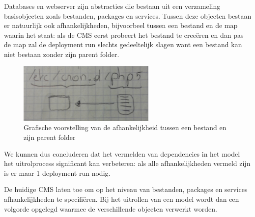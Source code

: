 Databases en webserver zijn abstracties die bestaan uit een verzameling basisobjecten zoals bestanden, packages en services.
Tussen deze objecten bestaan er natuurlijk ook afhankelijkheden, bijvoorbeel tussen een bestand en de map waarin het staat:
als de CMS eerst probeert het bestand te cree\"eren en dan pas de map zal de deployment run slechts gedeeltelijk slagen want een bestand kan niet bestaan zonder zijn parent folder.
\begin{figure}
    \label{fig:file_dir_dep}
    \begin{center}
    \includegraphics[width=0.6\textwidth]{images/file_dir_dep.png}
    \caption{Grafische voorstelling van de afhankelijkheid tussen een bestand en zijn parent folder}
    \end{center}
\end{figure}

We kunnen dus concluderen dat het vermelden van dependencies in het model het uitrolprocess significant kan verbeteren: als alle afhankelijkheden vermeld zijn is er maar 1 deployment run nodig.

De huidige CMS laten toe om op het niveau van bestanden, packages en services afhankelijkheden te specifi\"eren.
Bij het uitrollen van een model wordt dan een volgorde opgelegd waarmee de verschillende objecten verwerkt worden.

